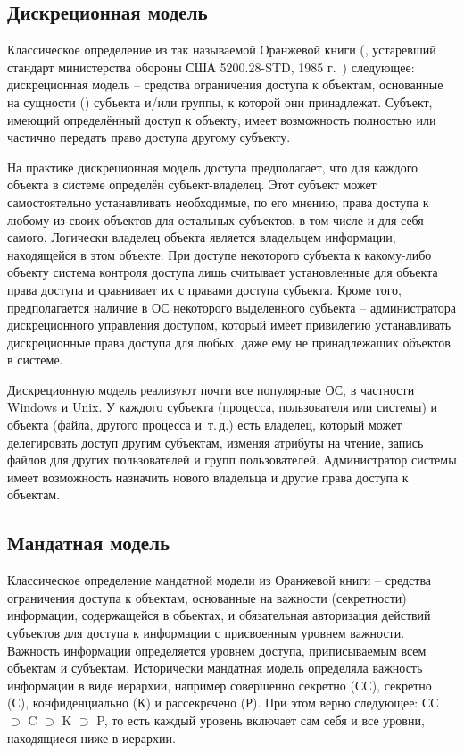 \subsection{Дискреционная модель}

Классическое определение из так называемой Оранжевой книги (, устаревший стандарт министерства обороны США 5200.28-STD, 1985 г.~\cite{DOD-5200.28-STD}) следующее: дискреционная модель -- средства ограничения доступа к объектам, основанные на сущности () субъекта и/или группы, к которой они принадлежат. Субъект, имеющий определённый доступ к объекту, имеет возможность полностью или частично передать право доступа другому субъекту.

На практике дискреционная модель доступа предполагает, что для каждого объекта в системе определён субъект-владелец. Этот субъект может самостоятельно устанавливать необходимые, по его мнению, права доступа к любому из своих объектов для остальных субъектов, в том числе и для себя самого. Логически владелец объекта является владельцем информации, находящейся в этом объекте. При доступе некоторого субъекта к какому-либо объекту система контроля доступа лишь считывает установленные для объекта права доступа и сравнивает их с правами доступа субъекта. Кроме того, предполагается наличие в ОС некоторого выделенного субъекта -- администратора дискреционного управления доступом, который имеет привилегию устанавливать дискреционные права доступа для любых, даже ему не принадлежащих объектов в системе.

Дискреционную модель реализуют почти все популярные ОС, в частности Windows и Unix. У каждого субъекта (процесса, пользователя или системы) и объекта (файла, другого процесса и~т.\,д.) есть владелец, который может делегировать доступ другим субъектам, изменяя атрибуты на чтение, запись файлов для других пользователей и групп пользователей. Администратор системы имеет возможность назначить нового владельца и другие права доступа к объектам.


\subsection{Мандатная модель}

Классическое определение мандатной модели из Оранжевой книги -- средства ограничения доступа к объектам, основанные на важности (секретности) информации, содержащейся в объектах, и обязательная авторизация действий субъектов для доступа к информации с присвоенным уровнем важности. Важность информации определяется уровнем доступа, приписываемым всем объектам и субъектам. Исторически мандатная модель определяла важность информации в виде иерархии, например совершенно секретно (СС), секретно (С), конфиденциально (К) и рассекречено (Р). При этом верно следующее: СС $\supset$ C $\supset$ K $\supset$ P, то есть каждый уровень включает сам себя и все уровни, находящиеся ниже в иерархии.

